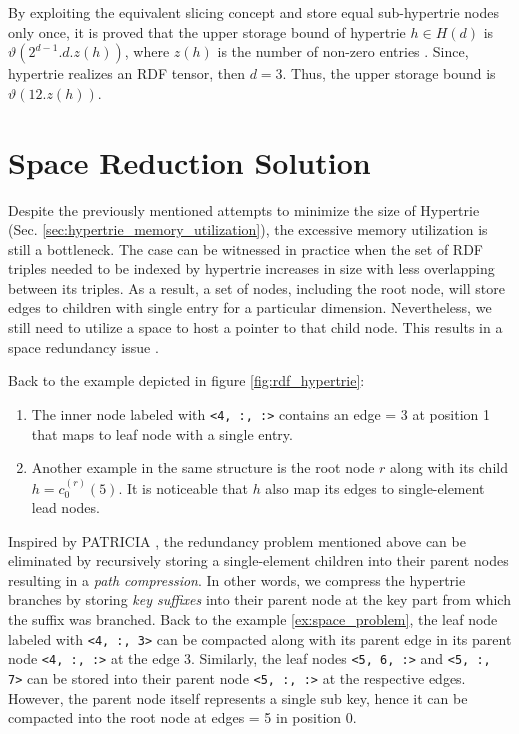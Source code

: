 By exploiting the equivalent slicing concept and store equal sub-hypertrie nodes only once, it is proved that the upper storage bound of hypertrie $h \in H(d)$ is $\vartheta(2^{d-1}. d . z(h))$, where $z(h)$ is the number of non-zero entries \cite{tentris2020}. Since, hypertrie realizes an RDF tensor, then $d=3$. Thus, the upper storage bound is $\vartheta(12 . z(h))$.
\vspace{0.5cm}

\section{Space Reduction Solution}
Despite the previously mentioned attempts to minimize the size of Hypertrie (Sec. \ref{sec:hypertrie_memory_utilization}), the excessive memory utilization is still a bottleneck. The case can be witnessed in practice when the set of RDF triples needed to be indexed by hypertrie increases in size with less overlapping between its triples. As a result, a set of nodes, including the root node, will store edges to children with single entry for a particular dimension. Nevertheless, we still need to utilize a space to host a pointer to that child node. This results in a space redundancy issue \cite{PATRICIA}. 

\begin{example}
\label{ex:space_problem}
Back to the example depicted in figure \ref{fig:rdf_hypertrie}:
\begin{enumerate}
	\item The inner node labeled with \verb|<4, :, :>| contains an edge = 3 at position 1 that maps to leaf node with a single entry. 
	\item Another example in the same structure is the root node $r$ along with its child $h = c_0^{(r)}(5)$. It is noticeable that  $h$ also map its edges to single-element lead nodes.
\end{enumerate}

\end{example}

Inspired by PATRICIA \cite{PATRICIA}, the redundancy problem mentioned above can be eliminated by recursively storing a single-element children into their parent nodes resulting in a \textit{path compression}. In other words, we compress the hypertrie branches by storing \textit{key suffixes} into their parent node at the key part from which the suffix was branched. Back to the example \ref{ex:space_problem}, the leaf node labeled with \verb|<4, :, 3>| can be compacted along with its parent edge in its parent node \verb|<4, :, :>| at the edge 3. Similarly, the leaf nodes \verb|<5, 6, :>| and \verb|<5, :, 7>| can be stored into their parent node \verb|<5, :, :>| at the respective edges. However, the parent node itself represents a single sub key, hence it can be compacted into the root node at edges = 5 in position 0. \\

